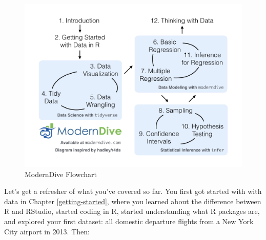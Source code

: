 \documentclass[12pt, krantz2,]{krantz}
\begin{document}
\begin{figure}

{\centering \includegraphics[width=\textwidth]{images/flowcharts/flowchart/flowchart.002} 

}

\caption{ModernDive Flowchart}\label{fig:moderndive-figure-conclusion}
\end{figure}

Let's get a refresher of what you've covered so far. You first got started with with data in Chapter \ref{getting-started}, where you learned about the difference between R and RStudio, started coding in R, started understanding what R packages are, and explored your first dataset: all domestic departure flights from a New York City airport in 2013. Then:
\end{document}
